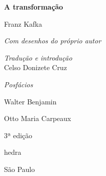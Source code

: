 




\begingroup\thispagestyle{empty}\vspace*{.05\textheight} 

              \formular
              \Huge
              \noindent
              \textbf{A transformação}
              

              
              {\brabo\LARGE
              \noindent Franz Kafka
              } 
              
              \vfill
              
              \newfontfamily{}
              {\fontsize{30}{40}\selectfont\minion\small
              \parindent0pt

              \textit{Com desenhos do próprio autor}\vspace{3em}

              \textit{Tradução e introdução}\\
              Celso Donizete Cruz \vspace{1em}
              
              \textit{Posfácios}

              Walter Benjamin 

              Otto Maria Carpeaux\vfill 
              }

              \noindent
              {\fontsize{30}{40}\selectfont\minion\small\noindent 3ª edição}

              \vfill

              \newfontfamily{}
              {\noindent\fontsize{30}{40}\selectfont \timesnewroman hedra}

              \vspace{-0.5cm}
              {\selectfont\minion\small\noindent São Paulo \quad\the\year}

\endgroup
\pagebreak
